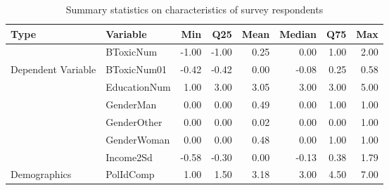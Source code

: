 \begin{table}[!h]
\centering
\caption{\label{tab:summ-tab1}Summary statistics on characteristics of survey respondents}
\centering
\begin{tabular}[t]{l|l|r|r|r|r|r|r}
\hline
Type & Variable & Min & Q25 & Mean & Median & Q75 & Max\\
\hline
 & BToxicNum & -1.00 & -1.00 & 0.25 & 0.00 & 1.00 & 2.00\\
\cline{2-8}
\multirow{-2}{*}{\raggedright\arraybackslash Dependent Variable} & BToxicNum01 & -0.42 & -0.42 & 0.00 & -0.08 & 0.25 & 0.58\\
\cline{1-8}
 & EducationNum & 1.00 & 3.00 & 3.05 & 3.00 & 3.00 & 5.00\\
\cline{2-8}
 & GenderMan & 0.00 & 0.00 & 0.49 & 0.00 & 1.00 & 1.00\\
\cline{2-8}
 & GenderOther & 0.00 & 0.00 & 0.02 & 0.00 & 0.00 & 1.00\\
\cline{2-8}
 & GenderWoman & 0.00 & 0.00 & 0.48 & 0.00 & 1.00 & 1.00\\
\cline{2-8}
 & Income2Sd & -0.58 & -0.30 & 0.00 & -0.13 & 0.38 & 1.79\\
\cline{2-8}
\multirow{-6}{*}{\raggedright\arraybackslash Demographics} & PolIdComp & 1.00 & 1.50 & 3.18 & 3.00 & 4.50 & 7.00\\
\hline
\end{tabular}
\end{table}
